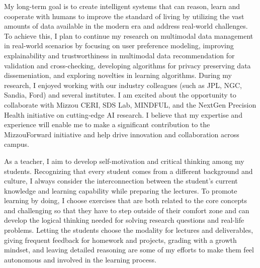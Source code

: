 \documentclass[11pt]{article}
\begin{document}
My long-term goal is to create intelligent systems that can reason, learn and cooperate with humans to improve the standard of living by utilizing the vast amounts of data available in the modern era and address real-world challenges.
To achieve this, I plan to continue my research on multimodal data management in real-world scenarios by focusing on user preference modeling, improving explainability and trustworthiness in multimodal data recommendation for validation and cross-checking, developing algorithms for privacy preserving data dissemeniation, and exploring novelties in learning algorithms. 
During my research, I enjoyed working with our industry colleagues (such as JPL, NGC, Sandia, Ford) and several institutes.
I am excited about the opportunity to collaborate with Mizzou CERI, SDS Lab, MINDFUL, and 
the NextGen Precision Health initiative 
on cutting-edge AI research. I believe that my expertise and experience will enable me to make a significant contribution to the MizzouForward initiative and help drive innovation and collaboration across campus.

\newpage
%
As a teacher, I aim to develop self-motivation and critical thinking among my students. Recognizing that every student comes from a different background and culture, I always consider the interconnection between the student's current knowledge and learning capability while preparing the lectures. To promote learning by doing, I choose exercises that are both related to the core concepts and challenging so that they have to step outside of their comfort zone and can develop the logical thinking needed for solving research questions and real-life problems. Letting the students choose the modality for lectures and deliverables, giving frequent feedback for homework and projects, grading with a growth mindset, and leaving detailed reasoning are some of my efforts to make them feel autonomous and involved in the learning process. 
\end{document}
